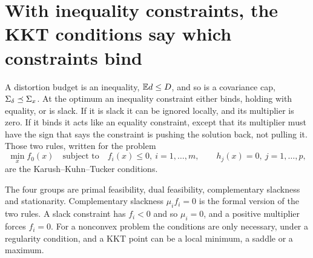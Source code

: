 
\section{With inequality constraints, the KKT conditions say which constraints bind}\label{sec:ch04:kkt}

A distortion budget is an inequality, $\mathbb{E} d\le D$, and so is a covariance cap, $\Sigma_\delta\preceq\Sigma_x$. At the optimum an inequality constraint either binds, holding with equality, or is slack. If it is slack it can be ignored locally, and its multiplier is zero. If it binds it acts like an equality constraint, except that its multiplier must have the sign that says the constraint is pushing the solution back, not pulling it. Those two rules, written for the problem
\begin{equation}\label{eq:ch04:problem}
\min_x f_0(x)\quad\text{subject to}\quad f_i(x)\le0,\ i=1,\dots,m,\qquad h_j(x)=0,\ j=1,\dots,p,
\end{equation}
are the Karush--Kuhn--Tucker conditions.


The four groups are primal feasibility, dual feasibility, complementary slackness and stationarity. Complementary slackness $\mu_if_i=0$ is the formal version of the two rules. A slack constraint has $f_i<0$ and so $\mu_i=0$, and a positive multiplier forces $f_i=0$. For a nonconvex problem the conditions are only necessary, under a regularity condition, and a KKT point can be a local minimum, a saddle or a maximum.


